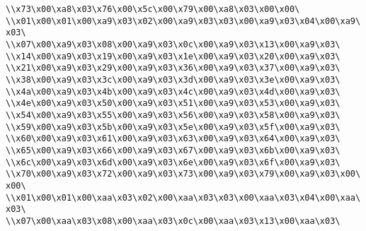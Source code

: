 \verb|\\x73\x00\xa8\x03\x76\x00\x5c\x00\x79\x00\xa8\x03\x00\x00\|\newline
\verb|\\x01\x00\x01\x00\xa9\x03\x02\x00\xa9\x03\x03\x00\xa9\x03\x04\x00\xa9\x03\|\newline
\verb|\\x07\x00\xa9\x03\x08\x00\xa9\x03\x0c\x00\xa9\x03\x13\x00\xa9\x03\|\newline
\verb|\\x14\x00\xa9\x03\x19\x00\xa9\x03\x1e\x00\xa9\x03\x20\x00\xa9\x03\|\newline
\verb|\\x21\x00\xa9\x03\x29\x00\xa9\x03\x36\x00\xa9\x03\x37\x00\xa9\x03\|\newline
\verb|\\x38\x00\xa9\x03\x3c\x00\xa9\x03\x3d\x00\xa9\x03\x3e\x00\xa9\x03\|\newline
\verb|\\x4a\x00\xa9\x03\x4b\x00\xa9\x03\x4c\x00\xa9\x03\x4d\x00\xa9\x03\|\newline
\verb|\\x4e\x00\xa9\x03\x50\x00\xa9\x03\x51\x00\xa9\x03\x53\x00\xa9\x03\|\newline
\verb|\\x54\x00\xa9\x03\x55\x00\xa9\x03\x56\x00\xa9\x03\x58\x00\xa9\x03\|\newline
\verb|\\x59\x00\xa9\x03\x5b\x00\xa9\x03\x5e\x00\xa9\x03\x5f\x00\xa9\x03\|\newline
\verb|\\x60\x00\xa9\x03\x61\x00\xa9\x03\x63\x00\xa9\x03\x64\x00\xa9\x03\|\newline
\verb|\\x65\x00\xa9\x03\x66\x00\xa9\x03\x67\x00\xa9\x03\x6b\x00\xa9\x03\|\newline
\verb|\\x6c\x00\xa9\x03\x6d\x00\xa9\x03\x6e\x00\xa9\x03\x6f\x00\xa9\x03\|\newline
\verb|\\x70\x00\xa9\x03\x72\x00\xa9\x03\x73\x00\xa9\x03\x79\x00\xa9\x03\x00\x00\|\newline
\verb|\\x01\x00\x01\x00\xaa\x03\x02\x00\xaa\x03\x03\x00\xaa\x03\x04\x00\xaa\x03\|\newline
\verb|\\x07\x00\xaa\x03\x08\x00\xaa\x03\x0c\x00\xaa\x03\x13\x00\xaa\x03\|\newline
